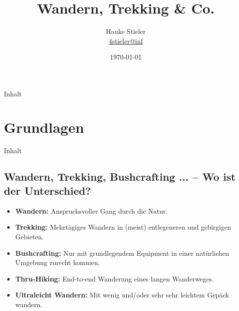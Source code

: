 \documentclass[aspectratio=169]{beamer}
\author{Hauke Stieler\\\href{mailto:4stieler@informatik.uni-hamburg.de}{4stieler@inf}}
\title{Wandern, Trekking \& Co.}
\date{\today}
\begin{document}
	{
		\maketitle
		\addtocounter{page}{-1}
	}
	
	\begin{frame}[t]{Inhalt}
	\tableofcontents[hidesubsections]
	\end{frame}
	
	\section{Grundlagen}
		
		\begin{frame}[t]{Inhalt}
		\end{frame}
	
		\subsection{Wandern, Trekking, Bushcrafting ... -- Wo ist der Unterschied?}
		
			\begin{frame}{}
				\begin{itemize}
					\item \textbf{Wandern:} Anspruchsvoller Gang durch die Natur.\pause
					\item \textbf{Trekking:} Mehrtägiges Wandern in (meist) entlegeneren und gebirgigen Gebieten.\pause
					\item \textbf{Bushcrafting:} Nur mit grundlegendem Equipment in einer natürlichen Umgebung zurecht kommen.\pause
					\item \textbf{Thru-Hiking:} End-to-end Wanderung eines langen Wanderweges.\pause
					\item \textbf{Ultraleicht Wandern:} Mit wenig und/oder sehr sehr leichtem Gepäck wandern.
				\end{itemize}
			\end{frame}
		
\end{document}
